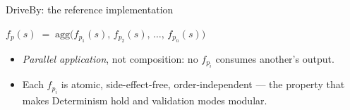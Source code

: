\documentclass[11pt,aspectratio=169]{beamer}
\begin{document}
\begin{frame}{DriveBy: the reference implementation}
\begin{center}
\end{center}

\vspace{-0.4em}
\begin{center}
\small
$f_p(s) \;=\; \mathrm{agg}\bigl(f_{p_1}(s),\, f_{p_2}(s),\, \dots,\, f_{p_n}(s)\bigr)$
\end{center}

\vspace{0.1em}
\footnotesize
\begin{itemize}\setlength\itemsep{0.1em}
\item \emph{Parallel application}, not composition: no $f_{p_i}$ consumes another's output.
\item Each $f_{p_i}$ is atomic, side-effect-free, order-independent --- the
  property that makes Determinism hold and validation modes modular.
\end{itemize}

\end{frame}
\end{document}

